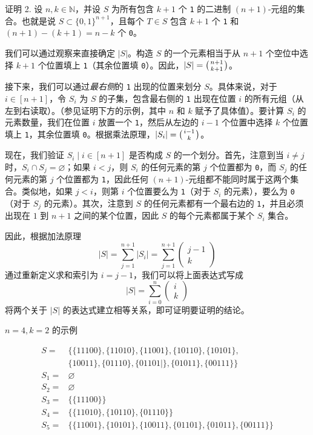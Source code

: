 \begin{proofs}{证明 2.}
    设 $n,k \in \mathbb{N}$，并设 $S$ 为所有包含 $k+1$ 个 \verb|1| 的二进制 $(n+1)$-元组的集合。也就是说 $S \subset \{0,1\}^{n+1}$，且每个 $T \in S$ 包含 $k+1$ 个 \verb|1| 和 $(n + 1) - (k + 1) = n - k$ 个 \verb|0|。

    我们可以通过观察来直接确定 $|S|$。构造 $S$ 的一个元素相当于从 $n + 1$ 个空位中选择 $k + 1$ 个位置填上 \verb|1|（其余位置填 \verb|0|）。因此，$|S| = \big({n+1 \atop k+1}\big)$。

    接下来，我们可以通过\emph{最右侧}的 \verb|1| 出现的位置来划分 $S$。具体来说，对于 $i \in [n + 1]$，令 $S_i$ 为 $S$ 的子集，包含最右侧的 \verb|1| 出现在位置 $i$ 的所有元组（从左到右读取）。（参见证明下方的示例，其中 $n$ 和 $k$ 赋予了具体值）。要计算 $S_i$ 的元素数量，我们在位置 $i$ 放置一个 \verb|1|，然后从左边的 $i - 1$ 个位置中选择 $k$ 个位置填上 \verb|1|，其余位置填 \verb|0|。根据乘法原理，$|S_i| = \big({i-1 \atop k}\big)$。

    现在，我们验证 ${S_i \mid i \in [n + 1]}$ 是否构成 $S$ 的一个划分。首先，注意到当 $i \ne j$ 时，$S_i \cap S_j = \varnothing$；如果 $i < j$，则 $S_i$ 的任何元素的第 $j$ 个位置都为 \verb|0|，而 $S_j$ 的任何元素的第 $j$ 个位置都为 \verb|1|，因此任何 $(n + 1)$-元组都不能同时属于这两个集合。类似地，如果 $j < i$，则第 $i$ 个位置要么为 \verb|1|（对于 $S_i$ 的元素），要么为 \verb|0|（对于 $S_j$ 的元素）。其次，注意到 $S$ 的任何元素都有一个最右边的 \verb|1|，并且必须出现在 $1$ 到 $n+1$ 之间的某个位置，因此 $S$ 的每个元素都属于某个 $S_i$ 集合。

    因此，根据加法原理
    \[|S| = \sum_{j=1}^{n+1} |S_i| = \sum_{j=1}^{n+1} \begin{pmatrix}j-1\\k\end{pmatrix}\]
    通过重新定义求和索引为 $i = j - 1$，我们可以将上面表达式写成
    \[|S| = \sum_{i=0}^{n} \begin{pmatrix}i\\k\end{pmatrix}\]
    将两个关于 $|S|$ 的表达式建立相等关系，即可证明要证明的结论。
\end{proofs}

$n = 4, k = 2$ 的示例

\begin{align*}
    S =   & \Big\{\{11100\}, \{11010\}, \{11001\}, \{10110\}, \{10101\},                  \\
          & \{10011\}, \{01110\}, \{01101|\}, \{01011\}, \{00111\}\Big\}                  \\
    S_1 = & \varnothing                                                                   \\
    S_2 = & \varnothing                                                                   \\
    S_3 = & \Big\{\{11100\} \Big\}                                                        \\
    S_4 = & \Big\{\{11010\}, \{10110\}, \{01110\} \Big\}                                  \\
    S_5 = & \Big\{\{11001\}, \{10101\}, \{10011\}, \{01101\}, \{01011\}, \{00111\} \Big\} \\
\end{align*}

